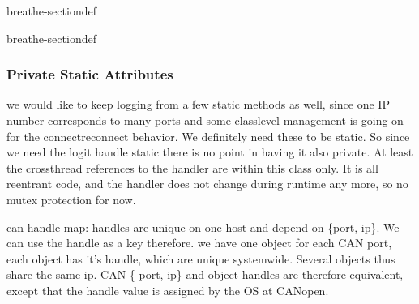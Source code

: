 \documentclass[a4paper,10pt,english]{sphinxmanual}
\begin{document}
\begin{fulllineitems}
\begin{sphinxuseclass}{breathe-sectiondef}
\begin{fulllineitems}
\end{fulllineitems}


\end{sphinxuseclass}
\begin{sphinxuseclass}{breathe-sectiondef}\subsubsection*{Private Static Attributes}


\begin{fulllineitems}
%
\pysigstartmultiline
{}%
\pysigstopmultiline
\sphinxAtStartPar
we would like to keep logging from a few static methods as well, since one IP number corresponds to many ports and some class\sphinxhyphen{}level management is going on for the connect\sphinxhyphen{}reconnect behavior. We definitely need these to be static. So since we need the logit handle static there is no point in having it also private. At least the cross\sphinxhyphen{}thread references to the handler are within this class only. It is all re\sphinxhyphen{}entrant code, and the handler does not change during runtime any more, so no mutex protection for now. 

\end{fulllineitems}


\end{sphinxuseclass}

\begin{fulllineitems}
%
\pysigstartmultiline
{}%
\pysigstopmultiline
\sphinxAtStartPar
can handle map: handles are unique on one host and depend on \{port, ip\}. We can use the handle as a key therefore. we have one object for each CAN port, each object has it’s handle, which are unique system\sphinxhyphen{}wide. Several objects thus share the same ip. CAN \{ port, ip\} and object handles are therefore equivalent, except that the handle value is assigned by the OS at CANopen. 

\end{fulllineitems}


\end{fulllineitems}
\end{document}

